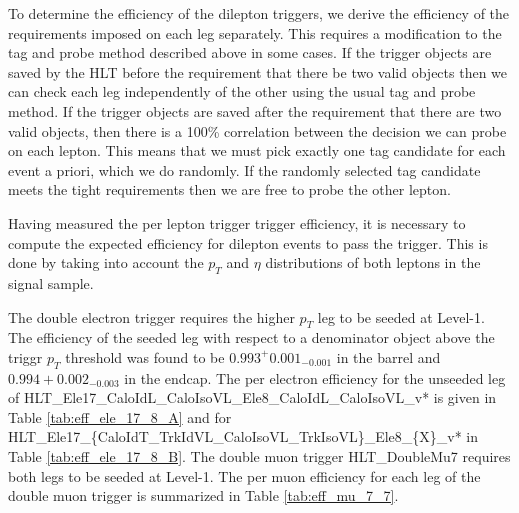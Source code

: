  
To determine the efficiency of the dilepton triggers, 
we derive the efficiency of the requirements imposed on each leg separately.
This requires a modification to the tag and probe method described above in some cases.
If the trigger objects are saved by the HLT before the requirement that there be two valid objects then
we can check each leg independently of the other using the usual tag and probe method.
If the trigger objects are saved after the requirement that there are two valid objects, then there is 
a 100\% correlation between the decision we can probe on each lepton.
This means that we must pick exactly one tag candidate for each event a priori, which we do 
randomly. 
If the randomly selected tag candidate meets the tight requirements then we are free to 
probe the other lepton.

Having measured the per lepton trigger trigger efficiency,
it is necessary to compute the expected efficiency for dilepton events to pass the trigger.
This is done by taking into account the $p_{T}$ and $\eta$ distributions
of both leptons in the signal sample.

The double electron trigger requires the higher $p_T$ leg to be seeded at Level-1.
The efficiency of the seeded leg with respect to a denominator object above the 
triggr $p_T$ threshold was found to be $0.993^+0.001_{-0.001}$ in the barrel and
$0.994+{0.002}_{-0.003}$ in the endcap.
The per electron efficiency for the unseeded leg of 
HLT\_Ele17\_CaloIdL\_CaloIsoVL\_Ele8\_CaloIdL\_CaloIsoVL\_v*
is given in Table \ref{tab:eff_ele_17_8_A} and for
HLT\_Ele17\_\{CaloIdT\_TrkIdVL\_CaloIsoVL\_TrkIsoVL\}\_Ele8\_\{X\}\_v* in
Table \ref{tab:eff_ele_17_8_B}.
The double muon trigger {HLT\_DoubleMu7 } requires both legs to be seeded at Level-1.
The per muon efficiency for each leg of the double muon trigger is
summarized in Table \ref{tab:eff_mu_7_7}.

